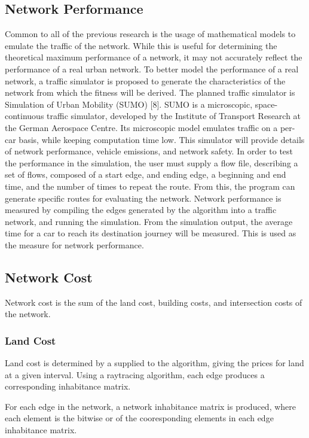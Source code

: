 \documentclass[11pt, oneside, notitlepage, draft]{article}
\begin{document}
        \subsection{Network Performance}
            Common to all of the previous research is the usage of mathematical models to emulate the traffic of the network. While this is useful for determining the theoretical maximum performance of a network, it may not accurately reflect the performance of a real urban network. To better model the performance of a real network, a traffic simulator is proposed to generate the characteristics of the network from which the fitness will be derived. The planned traffic simulator is Simulation of Urban Mobility (SUMO) [8].  SUMO is a microscopic, space-continuous traffic simulator, developed by the Institute of Transport Research at the German Aerospace Centre. Its microscopic model emulates traffic on a per-car basis, while keeping computation time low. This simulator will provide details of network performance, vehicle emissions, and network safety.
            In order to test the performance in the simulation, the user must supply a flow file, describing a set of flows, composed of a start edge, and ending edge, a beginning and end time, and the number of times to repeat the route. From this, the program can generate specific routes for evaluating the network.
            Network performance is measured by compiling the edges generated by the algorithm into a traffic network, and running the simulation. From the simulation output, the average time for a car to reach its destination journey will be measured. This is used as the measure for network performance.

        \subsection{Network Cost}
            Network cost is the sum of the land cost, building costs, and intersection costs of the network.
            \subsubsection{Land Cost}

                Land cost is determined by a supplied to the algorithm, giving the prices for land at a given interval. Using a raytracing algorithm, each edge produces a corresponding inhabitance matrix.

                For each edge in the network, a network inhabitance matrix is produced, where each element is the bitwise or of the cooresponding elements in each edge inhabitance matrix.
\end{document}
